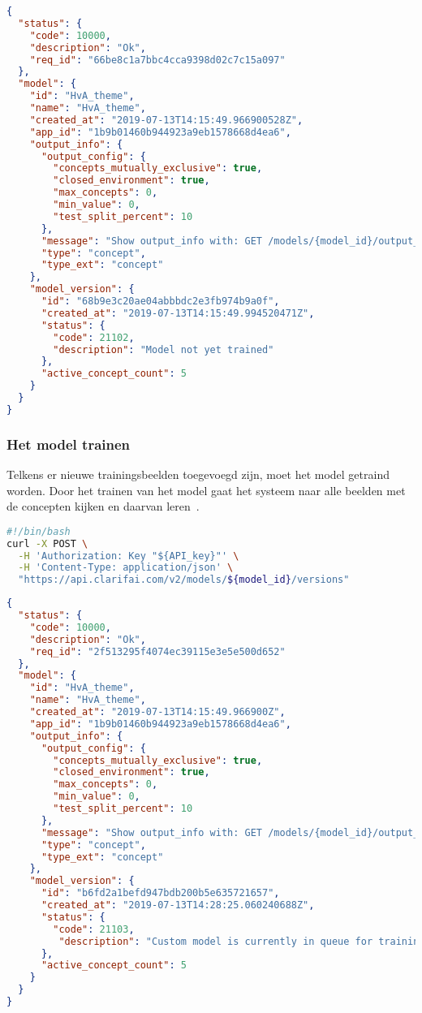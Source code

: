 \begin{lstlisting}[language=json,caption=antwoord van de API na het creëren van het model]
{
  "status": {
    "code": 10000,
    "description": "Ok",
    "req_id": "66be8c1a7bbc4cca9398d02c7c15a097"
  },
  "model": {
    "id": "HvA_theme",
    "name": "HvA_theme",
    "created_at": "2019-07-13T14:15:49.966900528Z",
    "app_id": "1b9b01460b944923a9eb1578668d4ea6",
    "output_info": {
      "output_config": {
        "concepts_mutually_exclusive": true,
        "closed_environment": true,
        "max_concepts": 0,
        "min_value": 0,
        "test_split_percent": 10
      },
      "message": "Show output_info with: GET /models/{model_id}/output_info",
      "type": "concept",
      "type_ext": "concept"
    },
    "model_version": {
      "id": "68b9e3c20ae04abbbdc2e3fb974b9a0f",
      "created_at": "2019-07-13T14:15:49.994520471Z",
      "status": {
        "code": 21102,
        "description": "Model not yet trained"
      },
      "active_concept_count": 5
    }
  }
}
\end{lstlisting}

\subsubsection{Het model trainen}
\label{subsubsec:model-trainen}

Telkens er nieuwe trainingsbeelden toegevoegd zijn, moet het model getraind worden. Door het trainen van het model gaat het systeem naar alle beelden met de concepten kijken en daarvan leren~\autocite{ClarifaiAPI}. 


\begin{lstlisting}[language=bash,caption=bash commando om het model te trainen]
#!/bin/bash
curl -X POST \
  -H 'Authorization: Key "${API_key}"' \
  -H 'Content-Type: application/json' \
  "https://api.clarifai.com/v2/models/${model_id}/versions" 
\end{lstlisting}

\begin{lstlisting}[language=json,caption=antwoord van de API nadat het model getraind werd]
{
  "status": {
    "code": 10000,
    "description": "Ok",
    "req_id": "2f513295f4074ec39115e3e5e500d652"
  },
  "model": {
    "id": "HvA_theme",
    "name": "HvA_theme",
    "created_at": "2019-07-13T14:15:49.966900Z",
    "app_id": "1b9b01460b944923a9eb1578668d4ea6",
    "output_info": {
      "output_config": {
        "concepts_mutually_exclusive": true,
        "closed_environment": true,
        "max_concepts": 0,
        "min_value": 0,
        "test_split_percent": 10
      },
      "message": "Show output_info with: GET /models/{model_id}/output_info",
      "type": "concept",
      "type_ext": "concept"
    },
    "model_version": {
      "id": "b6fd2a1befd947bdb200b5e635721657",
      "created_at": "2019-07-13T14:28:25.060240688Z",
      "status": {
        "code": 21103,
         "description": "Custom model is currently in queue for training, waiting on inputs to process."
      },
      "active_concept_count": 5
    }
  }
}
\end{lstlisting}

